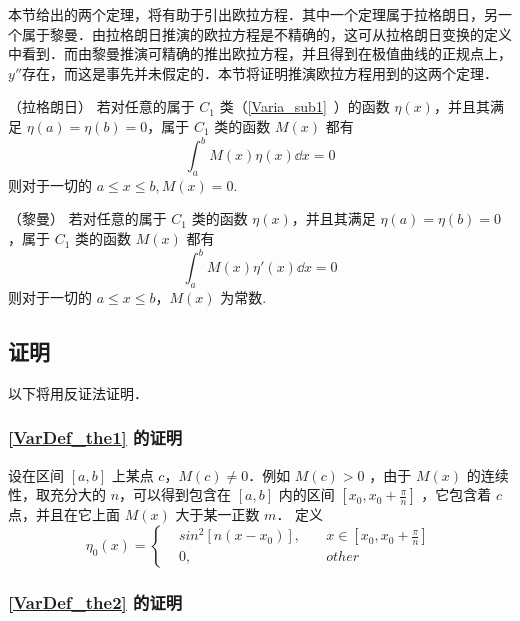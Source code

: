 
\begin{issues}
\issueTODO
\end{issues}

本节给出的两个定理，将有助于引出欧拉方程．其中一个定理属于拉格朗日，另一个属于黎曼．由拉格朗日推演的欧拉方程是不精确的，这可从拉格朗日变换的定义中看到．而由黎曼推演可精确的推出欧拉方程，并且得到在极值曲线的正规点上，$y''$存在，而这是事先并未假定的．本节将证明推演欧拉方程用到的这两个定理．

\begin{theorem}{（拉格朗日）}\label{VarDef_the1}
若对任意的属于 $C_1$ 类（\autoref{Varia_sub1}~）的函数 $\eta(x)$，并且其满足 $\eta(a)=\eta(b)=0$，属于 $C_1$ 类的函数 $M(x)$ 都有
\begin{equation}
\int_a^b M(x)\eta(x)\dd x=0
\end{equation}
则对于一切的 $a\leq x\leq b,M(x)=0$.
\end{theorem}
\begin{theorem}{（黎曼）}\label{VarDef_the2}
若对任意的属于 $C_1$ 类的函数 $\eta(x)$，并且其满足 $\eta(a)=\eta(b)=0$，属于 $C_1$ 类的函数 $M(x)$ 都有
\begin{equation}
\int_a^b M(x)\eta'(x)\dd x=0
\end{equation}
则对于一切的 $a\leq x\leq b$，$M(x)$ 为常数.
\end{theorem}
\subsection{证明}
以下将用反证法证明．
\subsubsection{\autoref{VarDef_the1} 的证明}
设在区间 $[a,b]$  上某点 $c$，$M(c)\neq0$．例如 $M(c)>0$ ，由于 $M(x)$ 的连续性，取充分大的 $n$，可以得到包含在 $[a,b]$ 内的区间 $[x_0,x_0+\frac{\pi}{n}]$ ，它包含着 $c$ 点，并且在它上面 $M(x)$ 大于某一正数 $m$．
定义
\begin{equation}
\eta_0(x)=\begin{cases}
&sin^2[n(x-x_0)],\quad &x\in[x_0,x_0+\frac{\pi}{n}]\\
&0,\quad &other
\end{cases}
\end{equation}

\subsubsection{\autoref{VarDef_the2} 的证明}